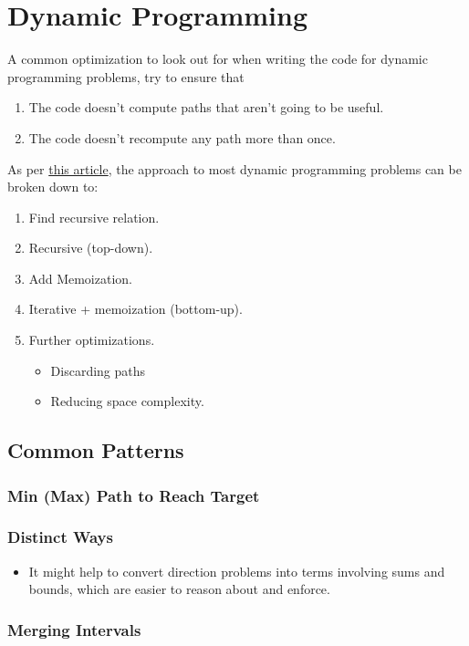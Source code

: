 \documentclass{report}
\begin{document}
\section{Dynamic Programming}
A common optimization to look out for when writing the code
for dynamic programming problems, try to ensure that
\begin{enumerate}
    \item The code doesn't compute paths that aren't going to be useful.
    \item The code doesn't recompute any path more than once.
\end{enumerate}
As per \href{https://leetcode.com/problems/house-robber/discuss/156523/From-good-to-great.-How-to-approach-most-of-DP-problems}{this article}, the approach to most dynamic programming problems can be broken
down to:
\begin{enumerate}
    \item Find recursive relation.
    \item Recursive (top-down).
    \item Add Memoization.
    \item Iterative + memoization (bottom-up).
    \item Further optimizations.
    \begin{itemize}
        \item Discarding paths
        \item Reducing space complexity.
    \end{itemize}
\end{enumerate}
\subsection{Common Patterns}
\subsubsection{Min (Max) Path to Reach Target}
\subsubsection{Distinct Ways}
\begin{itemize}
\item It might help to convert direction problems into terms involving sums and bounds, which are easier to reason about and enforce.
\end{itemize}
\subsubsection{Merging Intervals}
\end{document}
